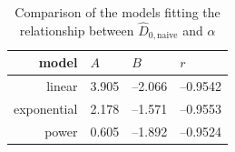 \begin{table}[tbp]
\centering
\caption{Comparison of the models fitting the relationship between $\hat{D}_{0,\mathrm{naive}}$ and $\alpha$}
\label{tab:model_results}
\begin{tabular}{r||l|l|l}
model       & $A$ & $B$ & $r$ \\ \hline \hline
linear      & 3.905 & --2.066 & --0.9542 \\
exponential & 2.178 & --1.571 & --0.9553 \\
power       & 0.605 & --1.892 & --0.9524
\end{tabular}
\end{table}